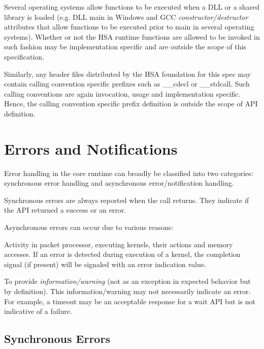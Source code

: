 \documentclass{book}
\newcommand{\emphld}[1]{\begin{DIFnomarkup} \emph{#1} \end{DIFnomarkup}}
\newenvironment{DIFnomarkup}{}{}
\begin{document}
Several operating systems allow functions to be executed when a DLL
or a shared library is loaded (e.g. DLL main in Windows and GCC
\emph{constructor/destructor} attributes that allow functions to be
executed prior to main in several operating systems).
Whether or not the HSA runtime functions are allowed to be invoked
in such fashion may be implementation specific and are outside the
scope of this specification.

Similarly, any header files distributed by the HSA foundation for
this spec may contain calling convention specific prefixes such as
\_\_cdecl or \_\_stdcall. Such calling conventions are again invocation,
usage and implementation specific. Hence, the calling convention
specific prefix definition is outside the scope of API definition.

\begin{DIFnomarkup}
\hypertarget{error}{}\section{Errors and Notifications}
\label{error}
\end{DIFnomarkup}

Error handling in the core runtime can broadly be classified into
two categories: synchronous error handling and asynchronous
error/notification handling.

Synchronous errors are always reported when the call returns. They
indicate if the API returned a success or an error.

Asynchronous errors can occur due to various reasons:
\begin{inparaenum}[(i)]

\item Activity in packet processor, executing kernels, their actions
and memory accesses. If an error is detected during execution of a
kernel, the completion signal (if present) will be signaled with an
error indication value.

\item To provide \emphld{information/warning} (not as an exception
in expected behavior but by definition). This information/warning
may not necessarily indicate an error. For example, a timeout may be
an acceptable response for a wait API but is not indicative of a
failure.

\end{inparaenum}

\begin{DIFnomarkup}
\hypertarget{syncerror}{}\subsection{Synchronous Errors }\label{syncerror}
\end{DIFnomarkup}
\end{document}
